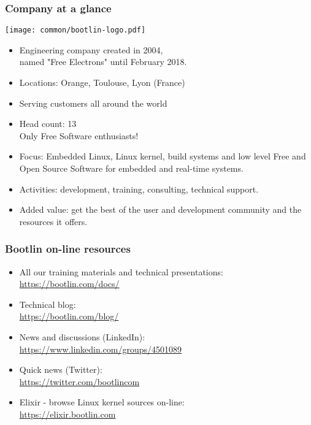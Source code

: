 \begin{frame}
\frametitle{Company at a glance}
  \texttt{[image: common/bootlin-logo.pdf]}
  \begin{itemize}
    \item Engineering company created in 2004,\\
          named "Free Electrons" until February 2018.
    \item Locations: Orange, Toulouse, Lyon (France)
    \item Serving customers all around the world
    \item Head count: 13 \\
	  Only Free Software enthusiasts!
    \item Focus: Embedded Linux, Linux kernel,
          build systems and low level Free and Open Source Software
          for embedded and real-time systems.
    \item Activities: development, training, consulting, technical
          support.
    \item Added value: get the best of the user and development
          community and the resources it offers.
  \end{itemize}
\end{frame}

\begin{frame}
\frametitle{Bootlin on-line resources}
  \begin{itemize}
    \item All our training materials and technical presentations:\\
          \url{https://bootlin.com/docs/}
    \item Technical blog:\\
          \url{https://bootlin.com/blog/}
    \item News and discussions (LinkedIn):\\
	  \url{https://www.linkedin.com/groups/4501089}
    \item Quick news (Twitter):\\
          \url{https://twitter.com/bootlincom}
    \item Elixir - browse Linux kernel sources on-line:\\
          \url{https://elixir.bootlin.com}
  \end{itemize}
\end{frame}
